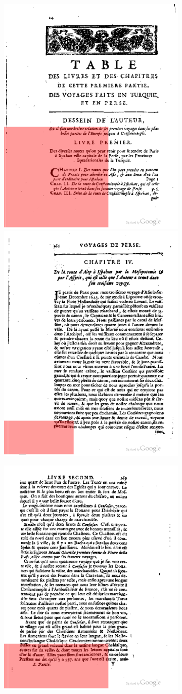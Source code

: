 \newpage

\begin{figure}[H]
	\centering
	\begin{subfigure}[b]{0.49\textwidth}
		\includegraphics[width=.49\textwidth]{resources/bad_extract_pic1}
		\includegraphics[width=.49\textwidth]{resources/bad_extract_pic6}
	\end{subfigure}
	\begin{subfigure}[b]{0.49\textwidth}
		\includegraphics[width=.49\textwidth]{resources/bad_extract_pic2}

\end{subfigure}
\end{figure}
